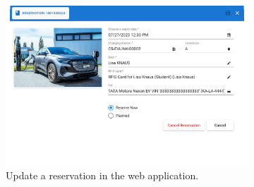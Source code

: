 \begin{figure}[h]
    \centering
     \begin{subfigure}[c]{0.6\textwidth}
         \includegraphics[width=\textwidth]{resources/images/main/6_implementation/screens/update_reservation/web/Update_Reservation.png}
         \captionsetup{skip=33pt}
         \caption{Update a reservation in the web application.}
         \label{fig:web-update-reservation-impl}
    \end{subfigure}
     \hfill
     \begin{subfigure}[c]{0.3\textwidth}

\end{subfigure}
\end{figure}
